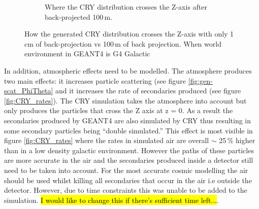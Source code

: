 \begin{figure}[!h]
\begin{subfigure}{.5\textwidth}
  \captionsetup{width=.9\linewidth}
  \caption{Where the CRY distribution crosses the Z-axis after back-projected 100\,m.}
  \label{subFig:Crossed_atZ_XY}
\end{subfigure}
\caption{How the generated CRY distribution crosses the Z-axis with only 1\,cm of back-projection vs 100\,m of back projection. When world environment in GEANT4 is G4 Galactic}
\label{fig:Crossed_atZ_XY_AndShort}
\end{figure}

In addition, atmospheric effects need to be modelled. The atmosphere produces two main effects: it increases particle scattering (see figure \ref{fig:gen-scat_PhiTheta} and it increases the rate of secondaries produced (see figure \ref{fig:CRY_rates}). The CRY simulation takes the atmosphere into account \cite{hagmann2007monteCry} but only produces the particles that cross the Z axis at z = 0. As a result the secondaries produced by GEANT4 are also simulated by CRY thus resulting in some secondary particles being ``double simulated.'' This effect is most visible in figure \ref{fig:CRY_rates} where the rates in simulated air are overall $\sim$ 25\,\% higher than in a low density galactic environment. However the paths of these particles are more accurate in the air and the secondaries produced inside a detector still need to be taken into account. For the most accurate cosmic modelling the air should be used whilst killing all secondaries that occur in the air i.e outside the detector. However, due to time constraints this was unable to be added to the simulation. \hl{I would like to change this if there's sufficient time left...}.

